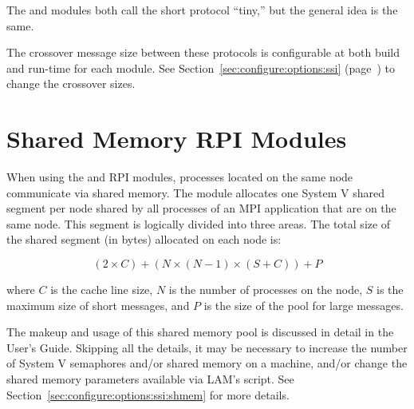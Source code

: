 The  and  modules both call the short protocol
``tiny,'' but the general idea is the same.

The crossover message size between these protocols is configurable at
both build and run-time for each module.  See
Section~\ref{sec:configure:options:ssi}
(page~\pageref{sec:configure:options:ssi}) to change the crossover
sizes.



\section{Shared Memory RPI Modules}
\label{sec:advanced:shm}

When using the  and  RPI modules, processes
located on the same node communicate via shared memory.  The module
allocates one System V shared segment per node shared by all processes of
an MPI application that are on the same node.
%
This segment is logically divided into three areas.  The total size
of the shared segment (in bytes) allocated on each node is:

\[ 
(2 \times C) + (N \times (N-1) \times (S + C)) + P
\]

where $C$ is the cache line size, $N$ is the number of processes on the
node, $S$ is the maximum size of short messages, and $P$ is the size
of the pool for large messages.  

The makeup and usage of this shared memory pool is discussed in detail
in the User's Guide.  Skipping all the details, it may be necessary to
increase the number of System V semaphores and/or shared memory on a
machine, and/or change the shared memory parameters available via
LAM's  script.  See
Section~\ref{sec:configure:options:ssi:shmem} for more details.


